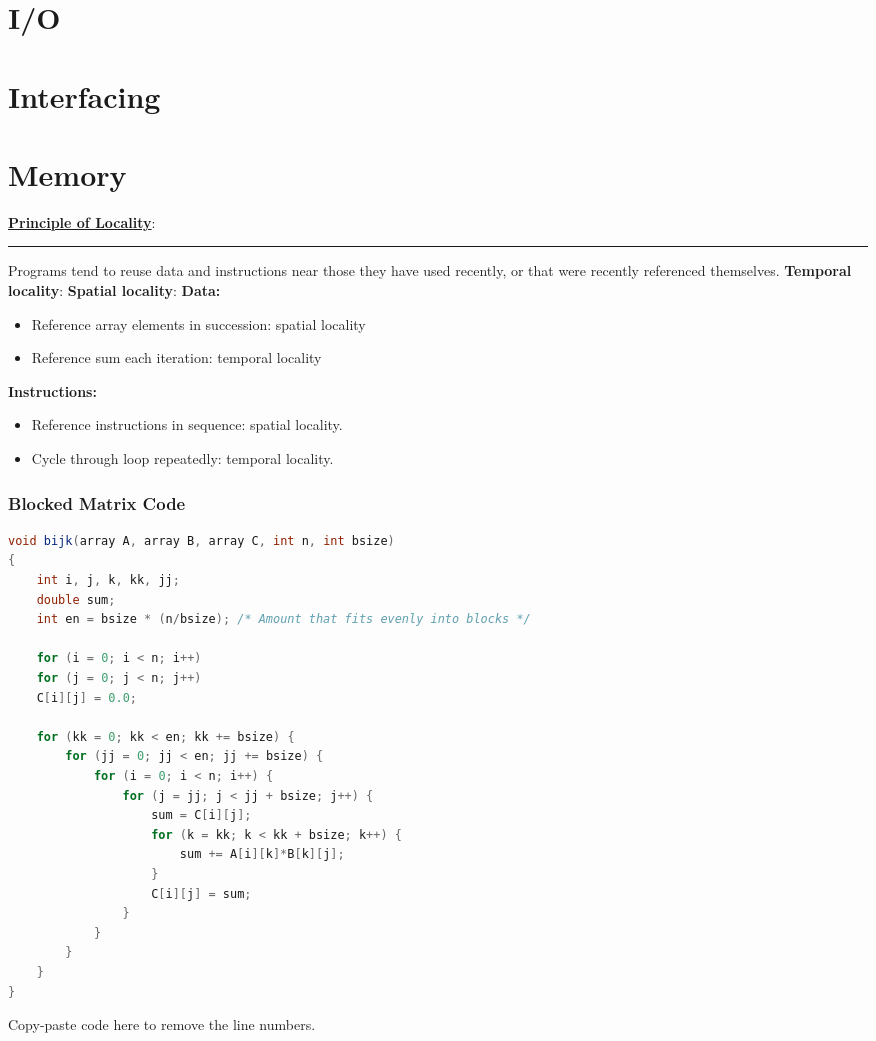 \begin{multicols}{2}
\section{I/O}
\section{Interfacing}
\section{Memory}
\textbf{\underline{Principle of Locality}}:
\hrule
Programs tend to reuse data and instructions near
those they have used recently, or that were recently
referenced themselves. \newline
\textbf{Temporal locality}:
\textbf{Spatial locality}:
\textbf{Data:}
\begin{itemize}
\item Reference array elements in succession: spatial locality
\item Reference sum each iteration: temporal locality
\end{itemize}
\textbf{Instructions:}
\begin{itemize}
\item Reference instructions in sequence: spatial locality.
\item Cycle through loop repeatedly: temporal locality.
\end{itemize}

\subsubsection{Blocked Matrix Code}
\begin{lstlisting}[language=Java]
void bijk(array A, array B, array C, int n, int bsize)
{
	int i, j, k, kk, jj;
	double sum;
	int en = bsize * (n/bsize); /* Amount that fits evenly into blocks */
	
	for (i = 0; i < n; i++)
	for (j = 0; j < n; j++)
	C[i][j] = 0.0;
	
	for (kk = 0; kk < en; kk += bsize) {
		for (jj = 0; jj < en; jj += bsize) {
			for (i = 0; i < n; i++) {
				for (j = jj; j < jj + bsize; j++) {
					sum = C[i][j];
					for (k = kk; k < kk + bsize; k++) {
						sum += A[i][k]*B[k][j];
					}
					C[i][j] = sum;
				}
			}
		}
	}
}
\end{lstlisting}
Copy-paste code here to remove the line numbers.
\end{multicols}
